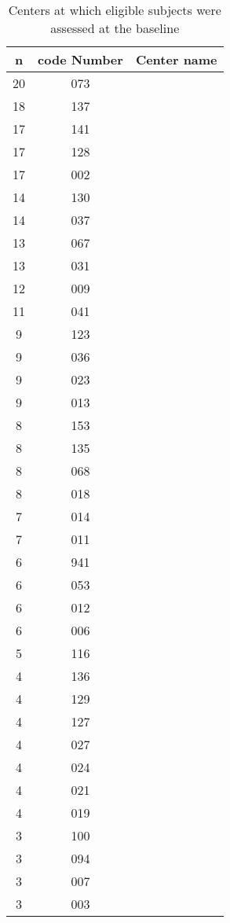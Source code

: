 \documentclass{elsarticle}
\begin{document}
\begin{table}[]
  \centering
  \begin{threeparttable}
    \caption{Centers at which eligible subjects were assessed at the baseline}
    \label{my-label}
    \begin{tabular}{ccl}
      \toprule
	   n\tnote{a} & code Number & Center name \\  
      \midrule
		20 & 073 &  \\   
		18 & 137 &  \\   
		17 & 141 &  \\   
		17 & 128 &  \\   
		17 & 002 &  \\   
		14 & 130 &  \\   
		14 & 037 &  \\   
		13 & 067 &  \\   
		13 & 031 &  \\   
		12 & 009 &  \\   
		11 & 041 &  \\   
		9 & 123 &  \\   
		9 & 036 &  \\   
		9 & 023 &  \\   
		9 & 013 &  \\   
		8 & 153 &  \\   
		8 & 135 &  \\   
		8 & 068 &  \\   
		8 & 018 &  \\   
		7 & 014 &  \\   
		7 & 011 &  \\   
		6 & 941 &  \\   
		6 & 053 &  \\   
		6 & 012 &  \\   
		6 & 006 &  \\   
		5 & 116 &  \\   
		4 & 136 &  \\   
		4 & 129 &  \\   
		4 & 127 &  \\   
		4 & 027 &  \\   
		4 & 024 &  \\   
		4 & 021 &  \\   
		4 & 019 &  \\   
		3 & 100 &  \\   
		3 & 094 &  \\   
		3 & 007 &  \\   
		3 & 003 &  \\   

\end{tabular}
\end{threeparttable}
\end{table}
\end{document}
